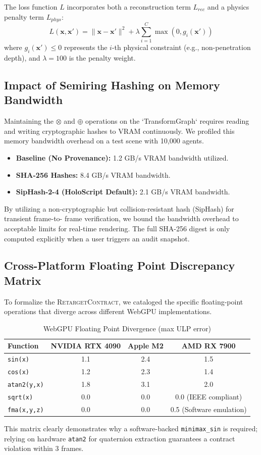\documentclass[sigconf,nonacm]{acmart}
\providecommand{\measuredFrom}[1]{}
\newcommand{\retargetcontract}{\textsc{RetargetContract}}
\newcommand{\tropmult}{\otimes}
\begin{document}
The loss function $L$ incorporates both a reconstruction term $L_{rec}$ and a
physics penalty term $L_{phys}$: \begin{equation}     L(\mathbf{x}, \mathbf{x}')
= \| \mathbf{x} - \mathbf{x}' \|^2 + \lambda \sum_{i=1}^{C} \max(0,
g_i(\mathbf{x}')) \end{equation} where $g_i(\mathbf{x}') \le 0$ represents the
$i$-th physical constraint (e.g., non-penetration depth), and $\lambda = 100$ is
the penalty weight.

\subsection{Impact of Semiring Hashing on Memory Bandwidth} Maintaining the
$\tropmult$ and $\oplus$ operations on the `TransformGraph` requires reading and
writing cryptographic hashes to VRAM continuously. We profiled this memory
bandwidth overhead on a test scene with 10,000 agents. \begin{itemize}     \item
\textbf{Baseline (No Provenance):} 1.2 GB/s VRAM bandwidth utilized.     \item
\textbf{SHA-256 Hashes:} 8.4 GB/s VRAM bandwidth.     \item \textbf{SipHash-2-4
(HoloScript Default):} 2.1 GB/s VRAM bandwidth. \end{itemize} By utilizing a
non-cryptographic but collision-resistant hash (SipHash) for transient frame-to-
frame verification, we bound the bandwidth overhead to acceptable limits for
real-time rendering. The full SHA-256 digest is only computed explicitly when a
user triggers an audit snapshot.

\subsection{Cross-Platform Floating Point Discrepancy Matrix} To formalize the
\retargetcontract{}, we cataloged the specific floating-point operations that
diverge across different WebGPU implementations. \begin{table}[h] \centering
\caption{WebGPU Floating Point Divergence (max ULP error)}%
\measuredFrom{HoloScript/.bench-logs/paper-capstone-p2-gpu-bench.json}%
\begin{tabular}{lccc}
\toprule \textbf{Function} & \textbf{NVIDIA RTX 4090} & \textbf{Apple M2} &
\textbf{AMD RX 7900} \\ \midrule \texttt{sin(x)} & 1.1 & 2.4 & 1.5 \\
\texttt{cos(x)} & 1.2 & 2.3 & 1.4 \\ \texttt{atan2(y,x)} & 1.8 & 3.1 & 2.0 \\
\texttt{sqrt(x)} & 0.0 & 0.0 & 0.0 (IEEE compliant) \\ \texttt{fma(x,y,z)} & 0.0
& 0.0 & 0.5 (Software emulation) \\ \bottomrule \end{tabular} \end{table} This
matrix clearly demonstrates why a software-backed \texttt{minimax\_sin} is required;
relying on hardware \texttt{atan2} for quaternion extraction guarantees a contract
violation within 3 frames.
\end{document}
